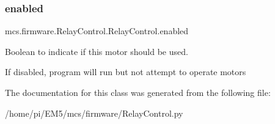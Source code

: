 \subsubsection{\texorpdfstring{enabled}{enabled}}
{\footnotesize\ttfamily mcs.\+firmware.\+Relay\+Control.\+Relay\+Control.\+enabled}



Boolean to indicate if this motor should be used. 

If disabled, program will run but not attempt to operate motors 

The documentation for this class was generated from the following file\+:\begin{DoxyCompactItemize}
\item 
/home/pi/\+E\+M5/mcs/firmware/Relay\+Control.\+py\end{DoxyCompactItemize}
